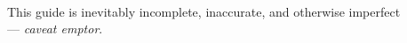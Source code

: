 

\clearpage
\renewcommand\indexname{Subject Index}
\thispagestyle{chapter}
\small
\begin{flushleft}
\printindex
\end{flushleft}
\normalsize

\addtocounter{page}{-1}
\newpage
\addtocounter{page}{+1}

~
\vfill

This guide is inevitably incomplete, inaccurate, and otherwise imperfect \\ {} \hfill   --- \emph{caveat emptor}.

